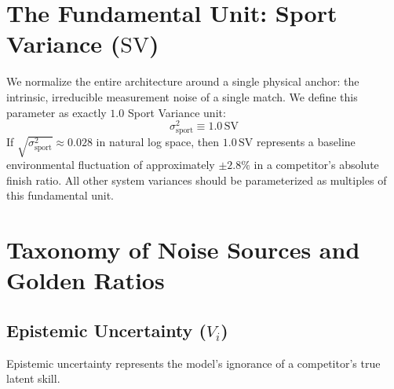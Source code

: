 \documentclass[12pt]{article}
\begin{document}
	\section{The Fundamental Unit: Sport Variance ($\text{SV}$)}
	We normalize the entire architecture around a single physical anchor: the intrinsic, irreducible measurement noise of a single match. We define this parameter as exactly $1.0$ Sport Variance unit:
	\begin{equation}
		\sigma_{\mathrm{sport}}^2 \equiv 1.0\,\text{SV}
	\end{equation}
	If $\sqrt{\sigma_{\mathrm{sport}}^2} \approx 0.028$ in natural log space, then $1.0\,\text{SV}$ represents a baseline environmental fluctuation of approximately $\pm 2.8\%$ in a competitor's absolute finish ratio. All other system variances should be parameterized as multiples of this fundamental unit.
	
	\section{Taxonomy of Noise Sources and Golden Ratios}
	
	\subsection{Epistemic Uncertainty ($V_i$)}
	Epistemic uncertainty represents the model's ignorance of a competitor's true latent skill. 
	
\end{document}
